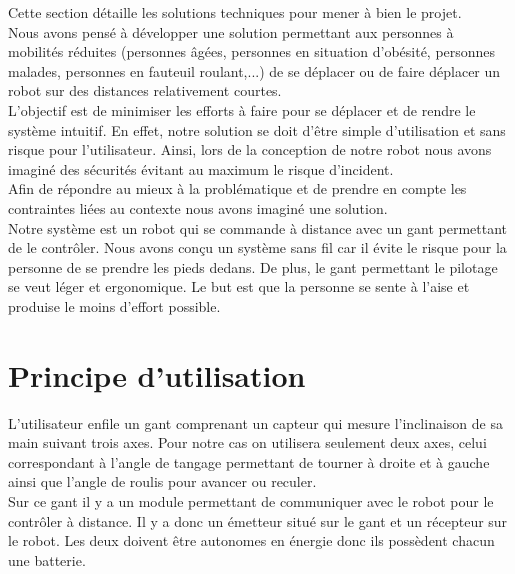 {Cette section détaille les solutions techniques pour mener à bien le projet.\\

Nous avons pensé à développer une solution permettant aux personnes à mobilités réduites (personnes âgées, personnes en situation d'obésité, personnes malades, personnes en fauteuil roulant,...) de se déplacer ou de faire déplacer un robot sur des distances relativement courtes. \\
L'objectif est de minimiser les efforts à faire pour se déplacer et de rendre le système intuitif. En effet, notre solution se doit d'être simple d'utilisation et sans risque pour l'utilisateur. Ainsi, lors de la conception de notre robot nous avons imaginé des sécurités évitant au maximum le risque d'incident. \\

Afin de répondre au mieux à la problématique et de prendre en compte les contraintes liées au contexte nous avons imaginé une solution. \\

Notre système est un robot qui se commande à distance avec un gant permettant de le contrôler.
Nous avons conçu un système sans fil car il évite le risque pour la personne de se prendre les pieds dedans. De plus, le gant permettant le pilotage se veut léger et ergonomique. Le but est que la personne se sente à l'aise et produise le moins d'effort possible. \\




\section{Principe d'utilisation}

L'utilisateur enfile un gant comprenant un capteur qui mesure l'inclinaison de sa main suivant trois axes. Pour notre cas on utilisera seulement deux axes, celui correspondant à l'angle de tangage permettant de tourner à droite et à gauche ainsi que l'angle de roulis pour avancer ou reculer. \\

Sur ce gant il y a un module permettant de communiquer avec le robot pour le contrôler à distance.
Il y a donc un émetteur situé sur le gant et un récepteur sur le robot.
Les deux doivent être autonomes en énergie donc ils possèdent chacun une batterie. \\

}
